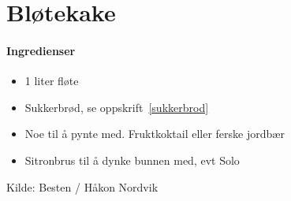 \section{﻿Bløtekake}


\paragraph{Ingredienser}
\begin{itemize}[noitemsep]
  \item 1 liter fløte
  \item Sukkerbrød, se oppskrift~\ref{sukkerbrod}
  \item Noe til å pynte med. Fruktkoktail eller ferske jordbær
  \item Sitronbrus til å dynke bunnen med, evt Solo
\end{itemize}


Kilde: Besten / Håkon Nordvik
